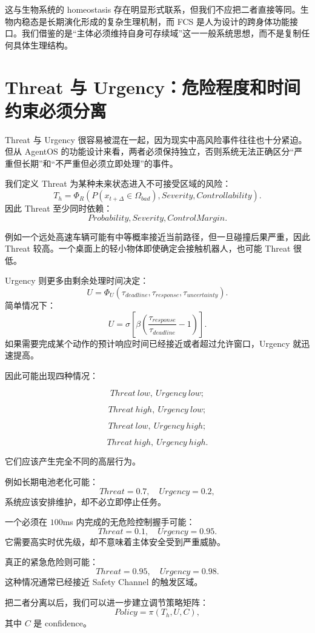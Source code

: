 这与生物系统的 homeostasis 存在明显形式联系，但我们不应把二者直接等同。生物内稳态是长期演化形成的复杂生理机制，而 FCS 是人为设计的跨身体功能接口。我们借鉴的是“主体必须维持自身可存续域”这一一般系统思想，而不是复制任何具体生理结构。

\section{Threat 与 Urgency：危险程度和时间约束必须分离}

Threat 与 Urgency 很容易被混在一起，因为现实中高风险事件往往也十分紧迫。但从 AgentOS 的功能设计来看，两者必须保持独立，否则系统无法正确区分“严重但长期”和“不严重但必须立即处理”的事件。

我们定义 Threat 为某种未来状态进入不可接受区域的风险：
\[
T_h
=
\Phi_R
\left(
P(x_{t+\Delta}\in\Omega_{bad}),
Severity,
Controllability
\right).
\]
因此 Threat 至少同时依赖：
\[
Probability,
Severity,
ControlMargin.
\]

例如一个远处高速车辆可能有中等概率接近当前路径，但一旦碰撞后果严重，因此 Threat 较高。一个桌面上的轻小物体即使确定会接触机器人，也可能 Threat 很低。

Urgency 则更多由剩余处理时间决定：
\[
U
=
\Phi_U
\left(
\tau_{deadline},
\tau_{response},
\tau_{uncertainty}
\right).
\]
简单情况下：
\[
U
=
\sigma
\left[
\beta
\left(
\frac{\tau_{response}}
{\tau_{deadline}}
-1
\right)
\right].
\]
如果需要完成某个动作的预计响应时间已经接近或者超过允许窗口，Urgency 就迅速提高。

因此可能出现四种情况：

\[
Threat\ low,\ Urgency\ low;
\]

\[
Threat\ high,\ Urgency\ low;
\]

\[
Threat\ low,\ Urgency\ high;
\]

\[
Threat\ high,\ Urgency\ high.
\]

它们应该产生完全不同的高层行为。

例如长期电池老化可能：
\[
Threat=0.7,\quad Urgency=0.2,
\]
系统应该安排维护，却不必立即停止任务。

一个必须在 $100$ms 内完成的无危险控制握手可能：
\[
Threat=0.1,\quad Urgency=0.95.
\]
它需要高实时优先级，却不意味着主体安全受到严重威胁。

真正的紧急危险则可能：
\[
Threat=0.95,\quad Urgency=0.98.
\]
这种情况通常已经接近 Safety Channel 的触发区域。

把二者分离以后，我们可以进一步建立调节策略矩阵：
\[
Policy
=
\pi(T_h,U,C),
\]
其中 $C$ 是 confidence。

